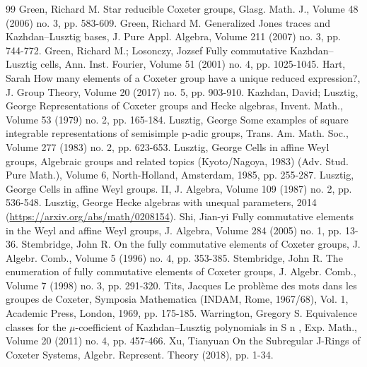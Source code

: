 \documentclass[10pt]{article}
\theoremstyle{definition}
\begin{document}
\begin{thebibliography}{99}
 Green, Richard M. Star reducible Coxeter groups, Glasg. Math. J., Volume 48 (2006) no. 3, pp. 583-609.
 Green, Richard M. Generalized Jones traces and Kazhdan–Lusztig bases, J. Pure Appl. Algebra, Volume 211 (2007) no. 3, pp. 744-772.
 Green, Richard M.; Losonczy, Jozsef Fully commutative Kazhdan–Lusztig cells, Ann. Inst. Fourier, Volume 51 (2001) no. 4, pp. 1025-1045.
 Hart, Sarah How many elements of a Coxeter group have a unique reduced expression?, J. Group Theory, Volume 20 (2017) no. 5, pp. 903-910.
 Kazhdan, David; Lusztig, George Representations of Coxeter groups and Hecke algebras, Invent. Math., Volume 53 (1979) no. 2, pp. 165-184.
 Lusztig, George Some examples of square integrable representations of semisimple p-adic groups, Trans. Am. Math. Soc., Volume 277 (1983) no. 2, pp. 623-653.
 Lusztig, George Cells in affine Weyl groups, Algebraic groups and related topics (Kyoto/Nagoya, 1983) (Adv. Stud. Pure Math.), Volume 6, North-Holland, Amsterdam, 1985, pp. 255-287.
 Lusztig, George Cells in affine Weyl groups. II, J. Algebra, Volume 109 (1987) no. 2, pp. 536-548.
 Lusztig, George Hecke algebras with unequal parameters, 2014 (\url{https://arxiv.org/abs/math/0208154}).
 Shi, Jian-yi Fully commutative elements in the Weyl and affine Weyl groups, J. Algebra, Volume 284 (2005) no. 1, pp. 13-36.
 Stembridge, John R. On the fully commutative elements of Coxeter groups, J. Algebr. Comb., Volume 5 (1996) no. 4, pp. 353-385.
 Stembridge, John R. The enumeration of fully commutative elements of Coxeter groups, J. Algebr. Comb., Volume 7 (1998) no. 3, pp. 291-320.
 Tits, Jacques Le problème des mots dans les groupes de Coxeter, Symposia Mathematica (INDAM, Rome, 1967/68), Vol. 1, Academic Press, London, 1969, pp. 175-185.
 Warrington, Gregory S. Equivalence classes for the \(\mu\)-coefficient of Kazhdan–Lusztig polynomials in S n , Exp. Math., Volume 20 (2011) no. 4, pp. 457-466.
 Xu, Tianyuan On the Subregular J-Rings of Coxeter Systems, Algebr. Represent. Theory (2018), pp. 1-34.
\end{thebibliography}
\end{document}
